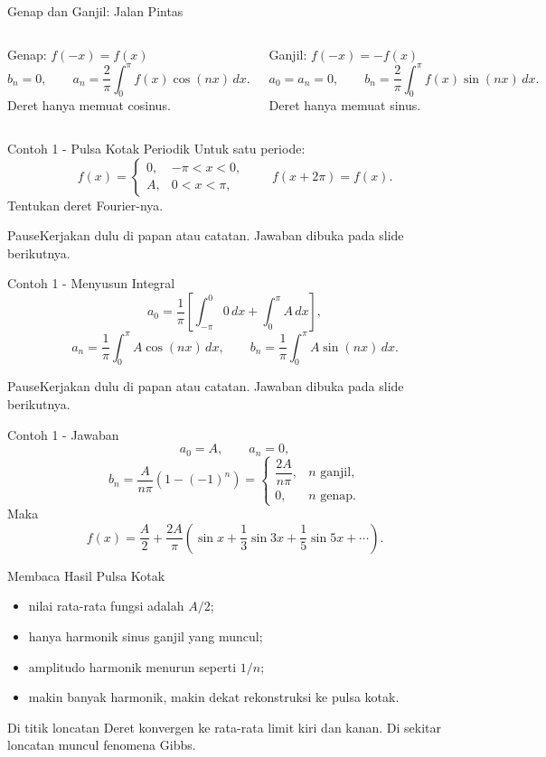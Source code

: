 \documentclass[aspectratio=169,10pt]{beamer}
\newcommand{\pauseboard}{\begin{alertblock}{Pause}Kerjakan dulu di papan atau catatan. Jawaban dibuka pada slide berikutnya.\end{alertblock}}
\begin{document}
\begin{frame}{Genap dan Ganjil: Jalan Pintas}
\begin{columns}[T]
\begin{block}{Genap: $f(-x)=f(x)$}
\[
b_n=0,\qquad
a_n=\frac2\pi\int_0^\pi f(x)\cos(nx)\,dx.
\]
Deret hanya memuat cosinus.
\end{block}
\begin{block}{Ganjil: $f(-x)=-f(x)$}
\[
a_0=a_n=0,\qquad
b_n=\frac2\pi\int_0^\pi f(x)\sin(nx)\,dx.
\]
Deret hanya memuat sinus.
\end{block}
\end{columns}
\end{frame}


\begin{frame}{Contoh 1 - Pulsa Kotak Periodik}
Untuk satu periode:
\[
f(x)=
\begin{cases}
0,&-\pi<x<0,\\
A,&0<x<\pi,
\end{cases}
\qquad f(x+2\pi)=f(x).
\]
Tentukan deret Fourier-nya.
\pauseboard
\end{frame}


\begin{frame}{Contoh 1 - Menyusun Integral}
\[
a_0=\frac1\pi\left[\int_{-\pi}^{0}0\,dx+\int_0^\pi A\,dx\right],
\]
\[
a_n=\frac1\pi\int_0^\pi A\cos(nx)\,dx,\qquad
b_n=\frac1\pi\int_0^\pi A\sin(nx)\,dx.
\]
\pauseboard
\end{frame}


\begin{frame}{Contoh 1 - Jawaban}
\[
a_0=A,\qquad a_n=0,
\]
\[
b_n=\frac{A}{n\pi}\left(1-(-1)^n\right)
=
\begin{cases}
\dfrac{2A}{n\pi},&n\text{ ganjil},\\
0,&n\text{ genap}.
\end{cases}
\]
Maka
\[
\boxed{
f(x)=\frac A2+\frac{2A}{\pi}
\left(\sin x+\frac13\sin3x+\frac15\sin5x+\cdots\right).
}
\]
\end{frame}


\begin{frame}{Membaca Hasil Pulsa Kotak}
\begin{itemize}
\item nilai rata-rata fungsi adalah $A/2$;
\item hanya harmonik sinus ganjil yang muncul;
\item amplitudo harmonik menurun seperti $1/n$;
\item makin banyak harmonik, makin dekat rekonstruksi ke pulsa kotak.
\end{itemize}
\begin{block}{Di titik loncatan}
Deret konvergen ke rata-rata limit kiri dan kanan. Di sekitar loncatan muncul fenomena Gibbs.
\end{block}
\end{frame}
\end{document}
